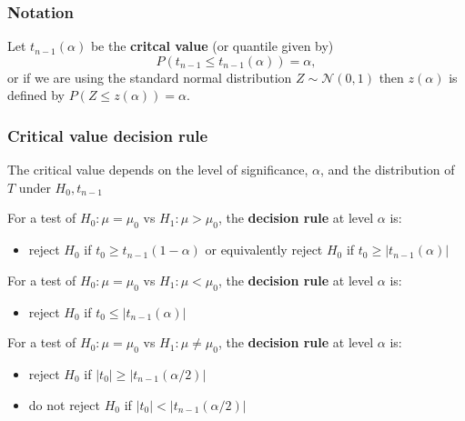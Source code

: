 \documentclass[a4paper]{article}
\begin{document}
\subsubsection{Notation}
Let \( t_{n-1} (\alpha) \) be the \textbf{critcal value} (or quantile given by)
\[
	P(t_{n-1} \le t_{n-1}(\alpha))=\alpha,
\]
or if we are using the standard normal distribution \(  Z \sim \mathcal{N} (0,1) \) then \( z(\alpha) \) is defined by \( P(Z \leq z(\alpha))=\alpha \).
\subsubsection{Critical value decision rule}
The critical value depends on the level of significance, \( \alpha \), and the distribution of \( T \) under \( H_0, t_{n-1} \)
\begin{greenbox}
	For a test of \( H_0: \mu = \mu_0 \) vs \( H_1: \mu > \mu_0 \), the \textbf{decision rule} at level \( \alpha \) is:
	\begin{itemize}
		\item reject \( H_0 \) if \( t_0 \geq t_{n-1} (1-\alpha) \) or equivalently reject \( H_0 \) if \( t_0 \geq \lvert t_{n-1} (\alpha) \rvert \) 
	\end{itemize}
	For a test of \( H_0: \mu = \mu_0 \) vs \( H_1: \mu < \mu_0 \), the \textbf{decision rule} at level \( \alpha \) is:
	\begin{itemize}
		\item reject \( H_0 \) if \( t_0 \leq \lvert t_{n-1} (\alpha) \rvert \) 
	\end{itemize}
	For a test of \( H_0: \mu = \mu_0 \) vs \( H_1: \mu \neq \mu_0 \), the \textbf{decision rule} at level \( \alpha \) is:
	\begin{itemize}
		\item reject \( H_0 \) if \( \lvert t_0 \rvert \geq \lvert t_{n-1} (\alpha / 2) \rvert \)
		\item do not reject \( H_0 \) if \( \lvert t_0 \rvert < \lvert t_{n-1} (\alpha / 2) \rvert \) 
	\end{itemize}
\end{greenbox}
\end{document}
